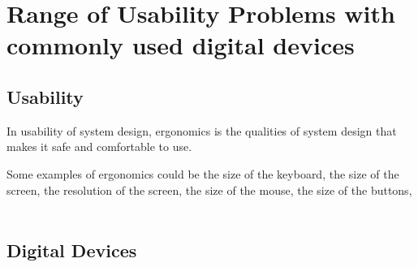 \documentclass[12pt,fleqn]{book} %
\begin{document}
\section{Range of Usability Problems with commonly used digital devices}

\subsection{Usability}
\begin{definition}[Effectiveness]
\end{definition}\par

\begin{definition}[Effiency]
\end{definition}\par

\begin{definition}[Ergonomics]
  In usability of system design, ergonomics is the qualities of system design 
  that makes it safe and comfortable to use.
\end{definition}\par
Some examples of ergonomics could be the size of the keyboard, the size of the 
screen, the resolution of the screen, the size of the mouse, the size of the 
buttons, 

\begin{align*}
\end{align*}

\begin{definition}[Accessibility]
\end{definition}\par


\subsection{Digital Devices}
\end{document}
